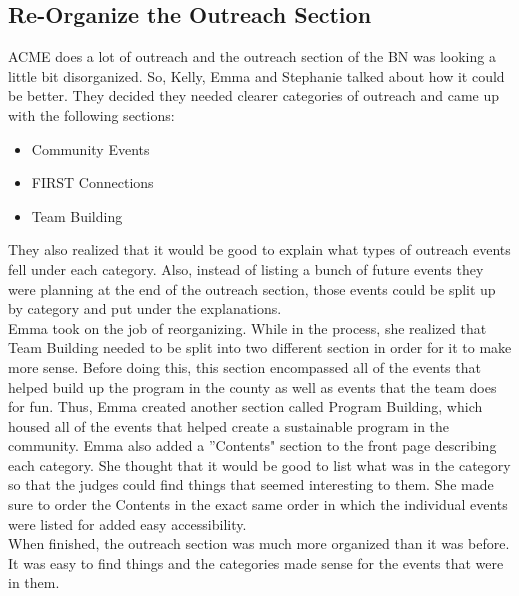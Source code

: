 \documentclass{article}
\begin{document}
\subsection{Re-Organize the Outreach Section}
ACME does a lot of outreach and the outreach section of the BN was looking a little bit disorganized. So, Kelly, Emma and Stephanie talked about how it could be better. They decided they needed clearer categories of outreach and came up with the following sections: 

\begin{itemize}
    \item Community Events
    \item FIRST Connections
    \item Team Building
\end{itemize}

They also realized that it would be good to explain what types of outreach events fell under each category. Also, instead of listing a bunch of future events they were planning at the end of the outreach section, those events could be split up by category and put under the explanations. \\

Emma took on the job of reorganizing. While in the process, she realized that Team Building needed to be split into two different section in order for it to make more sense. Before doing this, this section encompassed all of the events that helped build up the program in the county as well as events that the team does for fun. Thus, Emma created another section called Program Building, which housed all of the events that helped create a sustainable program in the community. Emma also added a ''Contents" section to the front page describing each category. She thought that it would be good to list what was in the category so that the judges could find things that seemed interesting to them. She made sure to order the Contents in the exact same order in which the individual events were listed for added easy accessibility. \\

When finished, the outreach section was much more organized than it was before. It was easy to find things and the categories made sense for the events that were in them. 
\end{document}
